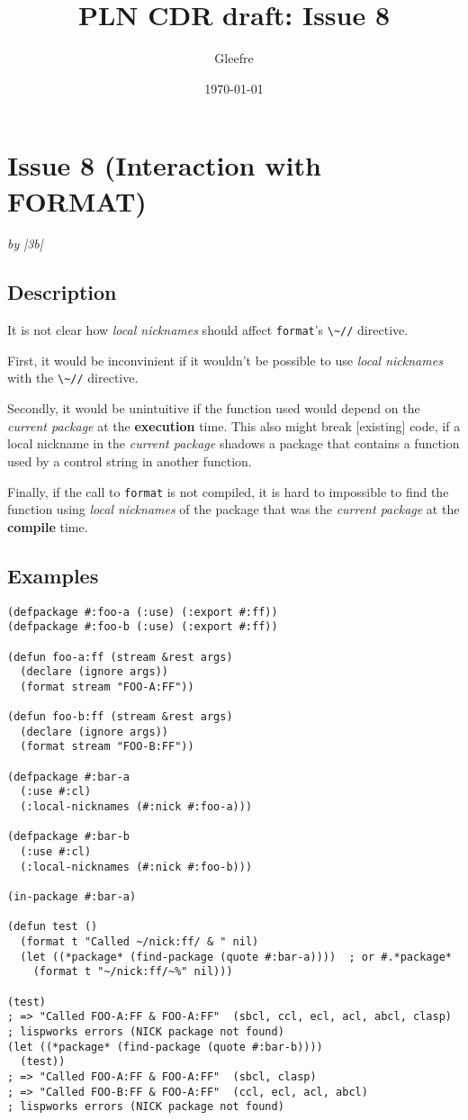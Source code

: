 \documentclass[11pt]{article}
\author{Gleefre}
\date{\today}
\title{PLN CDR draft: Issue 8}
\begin{document}
\maketitle

\section{Issue 8 (Interaction with FORMAT)}
\label{sec:orgfb20ba9}
\emph{by |3b|}
\subsection{Description}
\label{sec:orgffdabcc}
It is not clear how \emph{local nicknames} should affect \texttt{format}'s \texttt{\textbackslash{}\textasciitilde{}//} directive.

First, it would be inconvinient if it wouldn't be possible to use \emph{local
nicknames} with the \texttt{\textbackslash{}\textasciitilde{}//} directive.

Secondly, it would be unintuitive if the function used would depend on the
\emph{current package} at the \textbf{execution} time. This also might break [existing] code,
if a local nickname in the \emph{current package} shadows a package that contains a
function used by a control string in another function.

Finally, if the call to \texttt{format} is not compiled, it is hard to impossible to find
the function using \emph{local nicknames} of the package that was the \emph{current package}
at the \textbf{compile} time.
\subsection{Examples}
\label{sec:org44250f6}
\begin{verbatim}
(defpackage #:foo-a (:use) (:export #:ff))
(defpackage #:foo-b (:use) (:export #:ff))

(defun foo-a:ff (stream &rest args)
  (declare (ignore args))
  (format stream "FOO-A:FF"))

(defun foo-b:ff (stream &rest args)
  (declare (ignore args))
  (format stream "FOO-B:FF"))

(defpackage #:bar-a
  (:use #:cl)
  (:local-nicknames (#:nick #:foo-a)))

(defpackage #:bar-b
  (:use #:cl)
  (:local-nicknames (#:nick #:foo-b)))

(in-package #:bar-a)

(defun test ()
  (format t "Called ~/nick:ff/ & " nil)
  (let ((*package* (find-package (quote #:bar-a))))  ; or #.*package*
    (format t "~/nick:ff/~%" nil)))

(test)
; => "Called FOO-A:FF & FOO-A:FF"  (sbcl, ccl, ecl, acl, abcl, clasp)
; lispworks errors (NICK package not found)
(let ((*package* (find-package (quote #:bar-b))))
  (test))
; => "Called FOO-A:FF & FOO-A:FF"  (sbcl, clasp)
; => "Called FOO-B:FF & FOO-A:FF"  (ccl, ecl, acl, abcl)
; lispworks errors (NICK package not found)
\end{verbatim}
\end{document}
